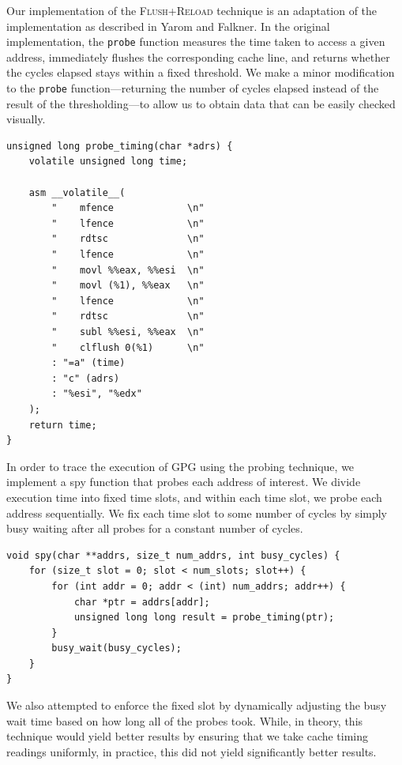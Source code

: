 \documentclass[11pt]{llncs}
\newcommand{\flushreload}{\textsc{Flush}+\textsc{Reload}}
\begin{document}
Our implementation of the \flushreload{} technique is an adaptation of the
implementation as described in Yarom and Falkner\cite{YF13}. In the original
implementation, the \texttt{probe} function measures the time taken to access a
given address, immediately flushes the corresponding cache line, and returns
whether the cycles elapsed stays within a fixed threshold.  We make a minor
modification to the \texttt{probe} function---returning the number of cycles
elapsed instead of the result of the thresholding---to allow us to obtain data
that can be easily checked visually.

\begin{lstlisting}[caption={Our trivially modified probe function}]
unsigned long probe_timing(char *adrs) {
    volatile unsigned long time;

    asm __volatile__(
        "    mfence             \n"
        "    lfence             \n"
        "    rdtsc              \n"
        "    lfence             \n"
        "    movl %%eax, %%esi  \n"
        "    movl (%1), %%eax   \n"
        "    lfence             \n"
        "    rdtsc              \n"
        "    subl %%esi, %%eax  \n"
        "    clflush 0(%1)      \n"
        : "=a" (time)
        : "c" (adrs)
        : "%esi", "%edx"
    );
    return time;
}
\end{lstlisting}

In order to trace the execution of GPG using the probing technique, we implement
a spy function that probes each address of interest. We divide execution time
into fixed time slots, and within each time slot, we probe each address
sequentially. We fix each time slot to some number of cycles by simply busy
waiting after all probes for a constant number of cycles.

\begin{lstlisting}[caption={Our spy function. Some minor details removed for
                            brevity}]
void spy(char **addrs, size_t num_addrs, int busy_cycles) {
    for (size_t slot = 0; slot < num_slots; slot++) {
        for (int addr = 0; addr < (int) num_addrs; addr++) {
            char *ptr = addrs[addr];
            unsigned long long result = probe_timing(ptr);
        }
        busy_wait(busy_cycles);
    }
}
\end{lstlisting}

We also attempted to enforce the fixed slot by dynamically adjusting the busy
wait time based on how long all of the probes took. While, in theory, this
technique would yield better results by ensuring that we take cache timing
readings uniformly, in practice, this did not yield significantly better
results.
\end{document}
